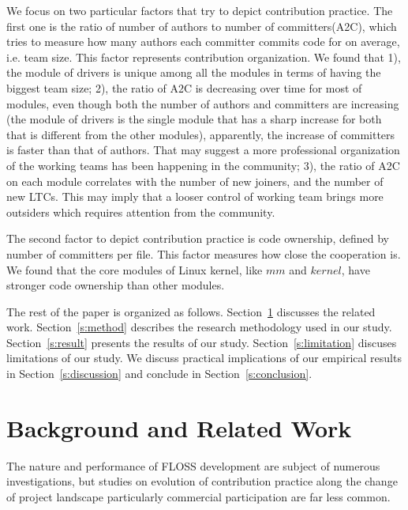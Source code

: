 \documentclass{sig-alternate-05-2015}
\begin{document}
{We focus on two particular factors that try to depict contribution practice.
The first one is the ratio of number of authors to number of committers(A2C), which tries to measure %
how many authors each committer commits code for on average, i.e. team size. This factor represents contribution organization. We found that
1), the module of drivers is unique among all the modules in terms of having the biggest team size; %
2), the ratio of A2C is decreasing over time for most of modules, even though both the number of authors and committers are increasing (the module of drivers is the single module that has a sharp increase for both that is different from the other modules), apparently, the increase of committers is faster than that of authors.
That may suggest a more professional organization of the working teams has been happening in the community;
3), the ratio of A2C on each module correlates with the number of new joiners, and the number of new LTCs. This may imply that a looser control of working team brings more outsiders which requires attention from the community.

The second factor to depict contribution practice is code ownership, defined by number of committers per file. This factor measures how close the cooperation is. We found that the core modules of Linux kernel, like $mm$ and $kernel$, have stronger code ownership than other modules.

The rest of the paper is organized as follows. Section~\ref{s:related}
discusses the related work. Section~\ref{s:method} describes the research
methodology used in our study. Section~\ref{s:result} presents the results
of our study. Section~\ref{s:limitation} discuses limitations of our study.
We discuss practical implications of our empirical results in Section~\ref{s:discussion}
and conclude in Section~\ref{s:conclusion}.

\section{Background and Related Work}\label{s:related}

The nature and performance of FLOSS development are subject of
numerous investigations, but studies on evolution of contribution practice
along the change of project landscape particularly commercial participation
 are far less common.

}
\end{document}
